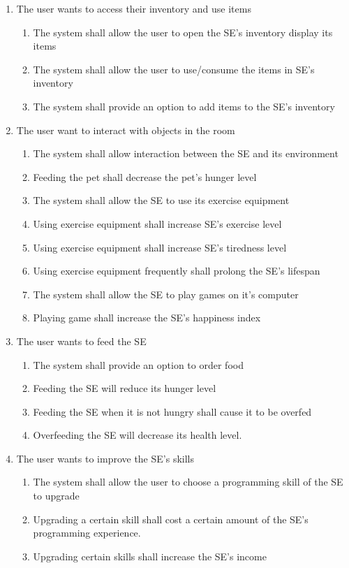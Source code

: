 \documentclass[]{article}
\begin{document}
\begin{enumerate}[start=1, label={\textbf{BE\arabic*.}}]
    \item The user wants to access their inventory and use items
	\begin{enumerate}[1.]
        \item The system shall allow the user to open the SE’s inventory display 
        its items
        \item The system shall allow the user to use/consume the items in SE’s 
        inventory
        \item The system shall provide an option to add items to the SE’s 
        inventory        
    \end{enumerate}

    \item The user want to interact with objects in the room
	\begin{enumerate}[1.]
        \item The system shall allow interaction between the SE and its environment
        \item Feeding the pet shall decrease the pet’s hunger level
        \item The system shall allow the SE to use its exercise equipment
        \item Using exercise equipment shall increase SE’s exercise level
        \item Using exercise equipment shall increase SE’s tiredness level
        \item Using exercise equipment frequently shall prolong the SE’s lifespan
        \item The system shall allow the SE to play games on it’s computer
        \item Playing game shall increase the SE’s happiness index
    \end{enumerate}

    \item The user wants to feed the SE
	\begin{enumerate}[1.]
        \item The system shall provide an option to order food
        \item Feeding the SE will reduce its hunger level
        \item Feeding the SE when it is not hungry shall cause it to be overfed
        \item Overfeeding the SE will decrease its health level.        
    \end{enumerate}

    \item The user wants to improve the SE’s skills
	\begin{enumerate}[1.]
        \item The system shall allow the user to choose a programming skill of 
        the SE to upgrade
        \item Upgrading a certain skill shall cost a certain amount of the SE’s 
        programming experience.
        \item Upgrading certain skills shall increase the SE’s income        
    \end{enumerate}


\end{enumerate}
\end{document}
